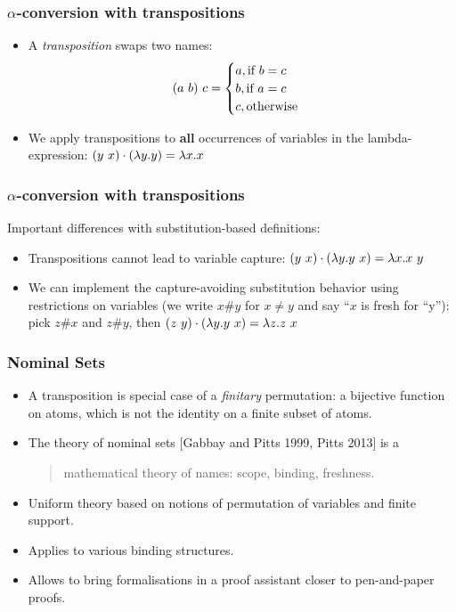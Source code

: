 \documentclass[10pt]{beamer}
\begin{document}
\begin{frame}
  \frametitle{$\alpha$-conversion with transpositions}
  \begin{itemize}
  \item A \emph{transposition} swaps two names:
    \[ (a ~ b)~c =
    \begin{cases}
      a, \text{if } b = c\\
      b, \text{if } a = c\\
      c, \text{otherwise}
    \end{cases} \]
  \item We apply transpositions to \textbf{all} occurrences of
    variables in the lambda-expression:
    $(y ~ x) \cdot (\lambda y.y) = \lambda x.x$
  \end{itemize}
\end{frame}

\begin{frame}
  \frametitle{$\alpha$-conversion with transpositions}
  Important differences with substitution-based definitions:
  \begin{itemize}
  \item Transpositions cannot lead to variable capture:
    $(y ~ x) \cdot (\lambda y.y~x) = \lambda x.x~y$
  \item We can implement the capture-avoiding substitution behavior
    using restrictions on variables (we write $x \# y$ for $x \neq y$
    and say ``$x$ is fresh for ``y''):\\
    \smallskip
    pick $z \# x$ and $z \# y$, then
    $(z ~ y) \cdot (\lambda y.y~x) = \lambda z.z~x$
  \end{itemize}
\end{frame}

\begin{frame}
  \frametitle{Nominal Sets}
  \begin{itemize}
  \item A transposition is special case of a \emph{finitary} permutation: a bijective function
    on atoms, which is not the identity on a finite subset of atoms.
    \pause
  \item The theory of nominal sets [Gabbay and Pitts 1999, Pitts 2013] is a
    \begin{quote}
    mathematical theory of names: scope, binding, freshness.
    \end{quote}
    \pause
    \item Uniform theory based on notions of permutation of variables and finite support.
    \item Applies to various binding structures.
    \item Allows to bring formalisations in a proof assistant closer to pen-and-paper proofs.
    \end{itemize}
\end{frame}
\end{document}
